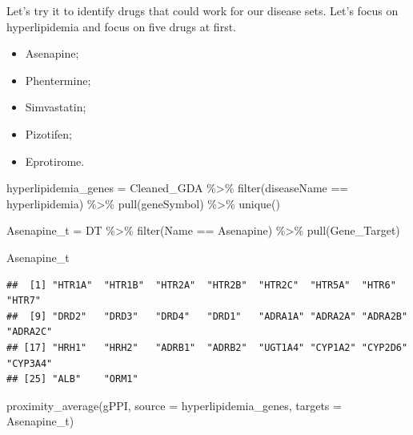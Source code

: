 \documentclass[
]{book}
\newenvironment{Shaded}{\begin{snugshade}}{\end{snugshade}}
\newcommand{\AttributeTok}[1]{\textcolor[rgb]{0.77,0.63,0.00}{#1}}
\newcommand{\FunctionTok}[1]{\textcolor[rgb]{0.00,0.00,0.00}{#1}}
\newcommand{\NormalTok}[1]{#1}
\newcommand{\OtherTok}[1]{\textcolor[rgb]{0.56,0.35,0.01}{#1}}
\newcommand{\SpecialCharTok}[1]{\textcolor[rgb]{0.00,0.00,0.00}{#1}}
\newcommand{\StringTok}[1]{\textcolor[rgb]{0.31,0.60,0.02}{#1}}
\providecommand{\tightlist}{%
  \setlength{\itemsep}{0pt}\setlength{\parskip}{0pt}}
\begin{document}
Let's try it to identify drugs that could work for our disease sets. Let's focus on hyperlipidemia and focus on five drugs at first.

\begin{itemize}
\tightlist
\item
  Asenapine;
\item
  Phentermine;
\item
  Simvastatin;
\item
  Pizotifen;
\item
  Eprotirome.
\end{itemize}

\begin{Shaded}
\begin{Highlighting}[]
\NormalTok{hyperlipidemia\_genes }\OtherTok{=}\NormalTok{ Cleaned\_GDA }\SpecialCharTok{\%\textgreater{}\%}
  \FunctionTok{filter}\NormalTok{(diseaseName }\SpecialCharTok{==} \StringTok{\textquotesingle{}hyperlipidemia\textquotesingle{}}\NormalTok{) }\SpecialCharTok{\%\textgreater{}\%} 
  \FunctionTok{pull}\NormalTok{(geneSymbol) }\SpecialCharTok{\%\textgreater{}\%} 
  \FunctionTok{unique}\NormalTok{()}

\NormalTok{Asenapine\_t }\OtherTok{=}\NormalTok{ DT }\SpecialCharTok{\%\textgreater{}\%} 
  \FunctionTok{filter}\NormalTok{(Name }\SpecialCharTok{==} \StringTok{\textquotesingle{}Asenapine\textquotesingle{}}\NormalTok{) }\SpecialCharTok{\%\textgreater{}\%}
  \FunctionTok{pull}\NormalTok{(Gene\_Target)}

\NormalTok{Asenapine\_t}
\end{Highlighting}
\end{Shaded}

\begin{verbatim}
##  [1] "HTR1A"  "HTR1B"  "HTR2A"  "HTR2B"  "HTR2C"  "HTR5A"  "HTR6"   "HTR7"  
##  [9] "DRD2"   "DRD3"   "DRD4"   "DRD1"   "ADRA1A" "ADRA2A" "ADRA2B" "ADRA2C"
## [17] "HRH1"   "HRH2"   "ADRB1"  "ADRB2"  "UGT1A4" "CYP1A2" "CYP2D6" "CYP3A4"
## [25] "ALB"    "ORM1"
\end{verbatim}

\begin{Shaded}
\begin{Highlighting}[]
\FunctionTok{proximity\_average}\NormalTok{(gPPI, }
                  \AttributeTok{source =}\NormalTok{ hyperlipidemia\_genes, }
                  \AttributeTok{targets =}\NormalTok{ Asenapine\_t)}
\end{Highlighting}
\end{Shaded}
\end{document}
